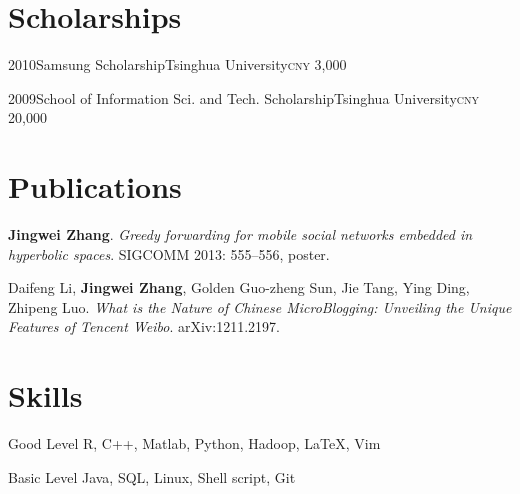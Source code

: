 \documentclass{tccv}
\begin{document}
\section{Scholarships}

\begin{yearlist}

\item{2010}{Samsung Scholarship}{Tsinghua University}{}{\textsc{cny} 3,000}
\item{2009}{School of Information Sci. and Tech. Scholarship}{Tsinghua University}{}{\textsc{cny} 20,000}


\end{yearlist}

\section{Publications}

\textbf{Jingwei Zhang}.
\emph{Greedy forwarding for mobile social networks embedded in hyperbolic spaces}.
SIGCOMM 2013: 555--556, poster.\medskip

Daifeng Li, \textbf{Jingwei Zhang}, Golden Guo-zheng Sun, Jie Tang, Ying
Ding, Zhipeng Luo.
\emph{What is the Nature of Chinese MicroBlogging: Unveiling the Unique Features of Tencent Weibo}.
arXiv:1211.2197.\medskip

\section{Skills}

\begin{factlist}

\item{Good Level}
      {R, C++, Matlab, Python, Hadoop, \LaTeX, Vim}

\item{Basic Level}
      {Java, SQL, Linux, Shell script, Git}

\end{factlist}
\end{document}
